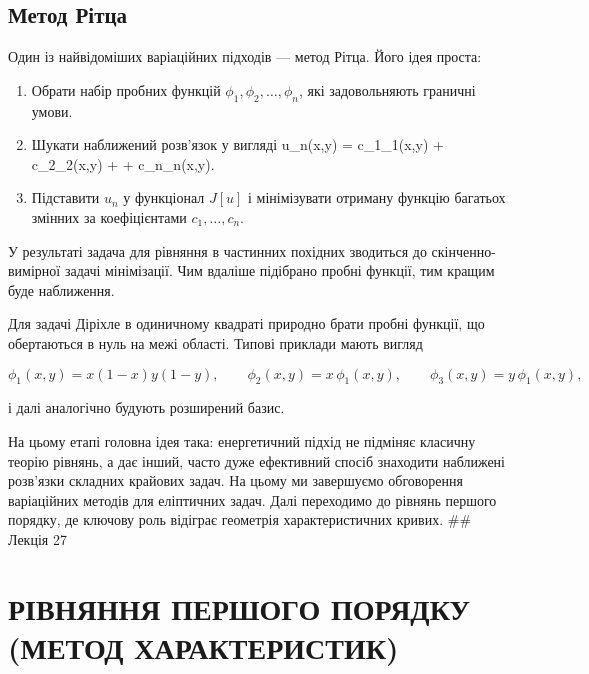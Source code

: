 \documentclass[
  ukrainian,
]{article}
\providecommand{\tightlist}{%
  \setlength{\itemsep}{0pt}\setlength{\parskip}{0pt}}
\begin{document}
\subsection{Метод
Рітца}\label{ux43cux435ux442ux43eux434-ux440ux456ux442ux446ux430}

Один із найвідоміших варіаційних підходів --- метод Рітца. Його ідея
проста:

\begin{enumerate}
\def\labelenumi{\arabic{enumi}.}
\tightlist
\item
  Обрати набір пробних функцій \(\phi_1, \phi_2, \ldots, \phi_n\), які
  задовольняють граничні умови.
\item
  Шукати наближений розв'язок у вигляді u\_n(x,y) = c\_1\phi\_1(x,y) +
  c\_2\phi\_2(x,y) + \cdots + c\_n\phi\_n(x,y).
\item
  Підставити \(u_n\) у функціонал \(J[u]\) і мінімізувати отриману
  функцію багатьох змінних за коефіцієнтами \(c_1,\ldots,c_n\).
\end{enumerate}

У результаті задача для рівняння в частинних похідних зводиться до
скінченно-вимірної задачі мінімізації. Чим вдаліше підібрано пробні
функції, тим кращим буде наближення.

Для задачі Діріхле в одиничному квадраті природно брати пробні функції,
що обертаються в нуль на межі області. Типові приклади мають вигляд

\[
\phi_1(x,y) = x(1-x)y(1-y), \qquad
\phi_2(x,y) = x\,\phi_1(x,y), \qquad
\phi_3(x,y) = y\,\phi_1(x,y),
\]

і далі аналогічно будують розширений базис.

На цьому етапі головна ідея така: енергетичний підхід не підміняє
класичну теорію рівнянь, а дає інший, часто дуже ефективний спосіб
знаходити наближені розв'язки складних крайових задач. На цьому ми
завершуємо обговорення варіаційних методів для еліптичних задач. Далі
переходимо до рівнянь першого порядку, де ключову роль відіграє
геометрія характеристичних кривих. \#\# Лекція 27

\section{РІВНЯННЯ ПЕРШОГО ПОРЯДКУ (МЕТОД
ХАРАКТЕРИСТИК)}\label{ux440ux456ux432ux43dux44fux43dux43dux44f-ux43fux435ux440ux448ux43eux433ux43e-ux43fux43eux440ux44fux434ux43aux443-ux43cux435ux442ux43eux434-ux445ux430ux440ux430ux43aux442ux435ux440ux438ux441ux442ux438ux43a}
\end{document}
